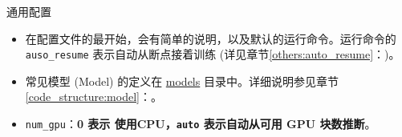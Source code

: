 \documentclass[../main.tex]{subfiles}
\begin{document}
\begin{exampleBox}[righthand ratio=0.00, sidebyside, sidebyside align=center, lower separated=false]{通用配置}
    \begin{itemize}
        \item 在配置文件的最开始，会有简单的说明，以及默认的运行命令。运行命令的 \texttt{auso\_resume} 表示自动从断点接着训练 (详见章节\ref{others:auto_resume}：)。
        \item 常见模型 (Model) 的定义在 \href{https://github.com/XPixelGroup/BasicSR/tree/master/basicsr/models}{models} 目录中。详细说明参见章节\ref{code_structure:model}：。
        \item \texttt{num\_gpu}：\textbf{0 表示 使用CPU，\texttt{auto} 表示自动从可用 GPU 块数推断}。
    \end{itemize}
\end{exampleBox}
\end{document}
